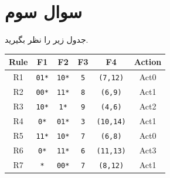 \section{سوال سوم}

جدول  زیر را نظر بگیرید.

\begin{latin}
	\begin{center}
		\begin{tabular}{|c|c|c|c|c|c|}
			\hline
			\textbf{Rule} & \textbf{F1} & \textbf{F2} & \textbf{F3} & \textbf{F4} & \textbf{Action} \\
			\hline\hline
			R1 & \texttt{01*} & \texttt{10*} & \texttt{5} & \texttt{(7,12)} & Act0 \\
			\hline\hline
			R2 & \texttt{00*} & \texttt{11*} & \texttt{8} & \texttt{(6,9)} & Act1 \\
			\hline
			R3 & \texttt{10*} & \texttt{1*} & \texttt{9} & \texttt{(4,6)} & Act2 \\
			\hline
			R4 & \texttt{0*} & \texttt{01*} & \texttt{3} & \texttt{(10,14)} & Act1 \\
			\hline
			R5 & \texttt{11*} & \texttt{10*} & \texttt{7} & \texttt{(6,8)} & Act0 \\
			\hline
			R6 & \texttt{0*} & \texttt{11*} & \texttt{6} & \texttt{(11,13)} & Act3 \\
			\hline
			R7 & \texttt{*} & \texttt{00*} & \texttt{7} & \texttt{(8,12)} & Act1 \\
			\hline
		\end{tabular}
	\end{center}
\end{latin}




